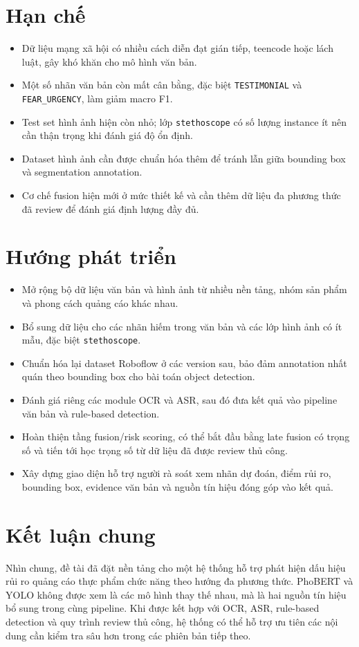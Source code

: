 \section{Hạn chế}
\begin{itemize}
    \item Dữ liệu mạng xã hội có nhiều cách diễn đạt gián tiếp, teencode hoặc lách luật, gây khó khăn cho mô hình văn bản.
    \item Một số nhãn văn bản còn mất cân bằng, đặc biệt \texttt{TESTIMONIAL} và \texttt{FEAR\_URGENCY}, làm giảm macro F1.
    \item Test set hình ảnh hiện còn nhỏ; lớp \texttt{stethoscope} có số lượng instance ít nên cần thận trọng khi đánh giá độ ổn định.
    \item Dataset hình ảnh cần được chuẩn hóa thêm để tránh lẫn giữa bounding box và segmentation annotation.
    \item Cơ chế fusion hiện mới ở mức thiết kế và cần thêm dữ liệu đa phương thức đã review để đánh giá định lượng đầy đủ.
\end{itemize}

\section{Hướng phát triển}
\begin{itemize}
    \item Mở rộng bộ dữ liệu văn bản và hình ảnh từ nhiều nền tảng, nhóm sản phẩm và phong cách quảng cáo khác nhau.
    \item Bổ sung dữ liệu cho các nhãn hiếm trong văn bản và các lớp hình ảnh có ít mẫu, đặc biệt \texttt{stethoscope}.
    \item Chuẩn hóa lại dataset Roboflow ở các version sau, bảo đảm annotation nhất quán theo bounding box cho bài toán object detection.
    \item Đánh giá riêng các module OCR và ASR, sau đó đưa kết quả vào pipeline văn bản và rule-based detection.
    \item Hoàn thiện tầng fusion/risk scoring, có thể bắt đầu bằng late fusion có trọng số và tiến tới học trọng số từ dữ liệu đã được review thủ công.
    \item Xây dựng giao diện hỗ trợ người rà soát xem nhãn dự đoán, điểm rủi ro, bounding box, evidence văn bản và nguồn tín hiệu đóng góp vào kết quả.
\end{itemize}

\section{Kết luận chung}
Nhìn chung, đề tài đã đặt nền tảng cho một hệ thống hỗ trợ phát hiện dấu hiệu rủi ro quảng cáo thực phẩm chức năng theo hướng đa phương thức. PhoBERT và YOLO không được xem là các mô hình thay thế nhau, mà là hai nguồn tín hiệu bổ sung trong cùng pipeline. Khi được kết hợp với OCR, ASR, rule-based detection và quy trình review thủ công, hệ thống có thể hỗ trợ ưu tiên các nội dung cần kiểm tra sâu hơn trong các phiên bản tiếp theo.
